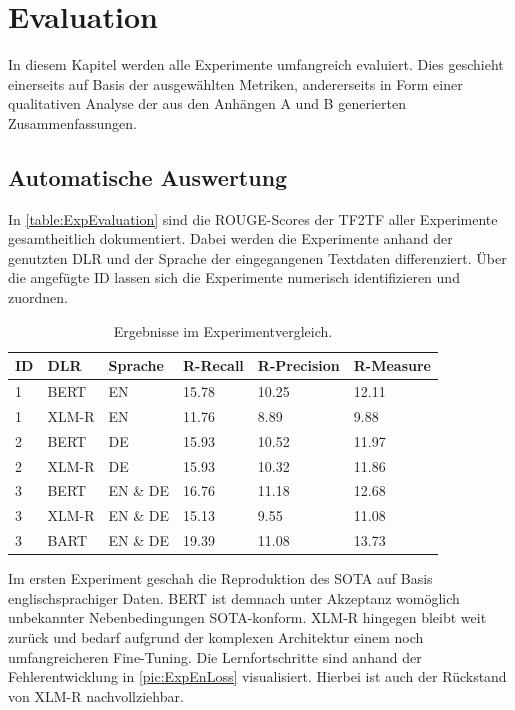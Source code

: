 \chapter{Evaluation}
\thispagestyle{fancy}
\label{chap:Evaluation}

\noindent
In diesem Kapitel werden alle Experimente umfangreich evaluiert. Dies geschieht einerseits auf Basis der ausgewählten Metriken, andererseits in Form einer qualitativen Analyse der aus den Anhängen A und B generierten Zusammenfassungen.


\section{Automatische Auswertung}
\noindent
In \autoref{table:ExpEvaluation} sind die \ac{ROUGE}-Scores der \ac{TF2TF} aller Experimente gesamtheitlich dokumentiert. Dabei werden die Experimente anhand der genutzten \ac{DLR} und der Sprache der eingegangenen Textdaten differenziert. Über die angefügte ID lassen sich die Experimente numerisch identifizieren und zuordnen.\\

\begin{table}[htb]
\centering
\begin{tabular}{ | p{1cm} | p{2.5cm} | p{2.5cm} | p{2.5cm} | p{2.5cm} | p{2.5cm} | }
\hline
\textbf{ID} & \textbf{DLR} & \textbf{Sprache} & \textbf{R-Recall} & \textbf{R-Precision} & \textbf{R-Measure} \\
\hline
1 & BERT & EN & 15.78 & 10.25 & 12.11 \\
\hline
1 & XLM-R & EN & 11.76 & 8.89 & 9.88 \\
\hline
2 & BERT & DE & 15.93 & 10.52 & 11.97 \\
\hline
2 & XLM-R & DE & 15.93 & 10.32 & 11.86 \\
\hline
3 & BERT & EN \& DE & 16.76 & 11.18 & 12.68 \\
\hline
3 & XLM-R & EN \& DE & 15.13 & 9.55 & 11.08 \\
\hline
3 & BART & EN \& DE & 19.39 & 11.08 & 13.73 \\
\hline
\end{tabular}
\caption{Ergebnisse im Experimentvergleich.}
\label{table:ExpEvaluation}
\end{table}

\noindent
Im ersten Experiment geschah die Reproduktion des \ac{SOTA} auf Basis englischsprachiger Daten. \ac{BERT} ist demnach unter Akzeptanz womöglich unbekannter Nebenbedingungen \ac{SOTA}-konform. \ac{XLM-R} hingegen bleibt weit zurück und bedarf aufgrund der komplexen Architektur einem noch umfangreicheren Fine-Tuning. Die Lernfortschritte sind anhand der Fehlerentwicklung in \autoref{pic:ExpEnLoss} visualisiert. Hierbei ist auch der Rückstand von \ac{XLM-R} nachvollziehbar.\\

